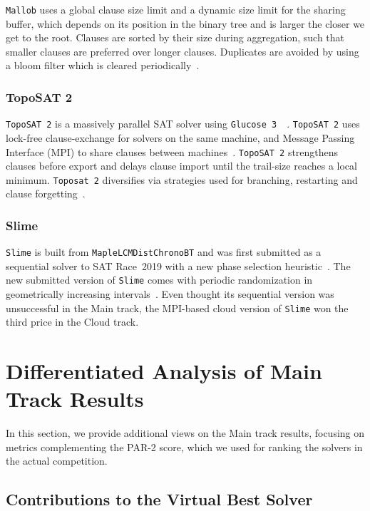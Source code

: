 \documentclass{elsarticle}
\newcommand{\solver}[1]{\texttt{#1}}
\begin{document}
\solver{Mallob} uses a global clause size limit and a dynamic size limit for the sharing buffer, which depends on its position in the binary tree and is larger the closer we get to the root. 
Clauses are sorted by their size during aggregation, such that smaller clauses are preferred over longer clauses. 
Duplicates are avoided by using a bloom filter which is cleared periodically~\cite{Schreiber:SC2020}. 


\subsubsection{TopoSAT 2}

\solver{TopoSAT~2} is a massively parallel SAT solver using \solver{Glucose~3}~\cite{Audemard:2018:Glucose}~\cite{Ehlers:2018:Toposat2}. 
\solver{TopoSAT~2} uses lock-free clause-exchange for solvers on the same machine, and Message Passing Interface (MPI) to share clauses between machines~\cite{Hamadi:2009:ManySat}. 
\solver{TopoSAT~2} strengthens clauses before export and delays clause import until the trail-size reaches a local minimum. 
\solver{Toposat~2} diversifies via strategies used for branching, restarting and clause forgetting~\cite{Ehlers:SC2020}. 


\subsubsection{Slime}

\solver{Slime} is built from \solver{MapleLCMDistChronoBT} and was first submitted as a sequential solver to SAT Race~2019 with a new phase selection heuristic~\cite{Riveros:SC2019}. 
The new submitted version of \solver{Slime} comes with periodic randomization in geometrically increasing intervals~\cite{Riveros:SC2020}. 
Even thought its sequential version was unsuccessful in the Main track, the MPI-based cloud version of \solver{Slime} won the third price in the Cloud track. 


\section{Differentiated Analysis of Main Track Results}
\label{sec:analysis}

In this section, we provide additional views on the Main track results,
focusing on metrics complementing the PAR-2 score, 
which we used for ranking the solvers in the actual competition.

\subsection{Contributions to the Virtual Best Solver}
\end{document}
